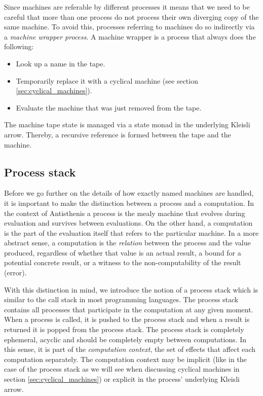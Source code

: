 Since machines are referable by different processes it means that we
need to be careful that more than one process do not process their own
diverging copy of the same machine. To avoid this, processes referring
to machines do so indirectly via a \emph{machine wrapper process}. A
machine wrapper is a process that always does the following:

\begin{itemize}
\item Look up a name in the tape.
\item Temporarily replace it with a cyclical machine (see section
  \ref{sec:cyclical_machines}).
\item Evaluate the machine that was just removed from the tape.
\end{itemize}

The machine tape state is managed via a state monad in the underlying
Kleisli arrow. Thereby, a recursive reference is formed between the
tape and the machine.

\subsection{Process stack}
\label{sec:process_stack}

Before we go further on the details of how exactly named machines
are handled, it is important to make the distinction between a process
and a computation. In the context of Antisthenis a process is the
mealy machine that evolves during evaluation and survives between
evaluations. On the other hand, a computation is the part of the
evaluation itself that refers to the particular machine. In a more
abstract sense, a computation is the \emph{relation} between the
process and the value produced, regardless of whether that value is an
actual result, a bound for a potential concrete result, or a witness to the
non-computability of the result (error).

With this distinction in mind, we introduce the notion of a process
stack which is similar to the call stack in most programming
languages. The process stack contains all processes that participate
in the computation at any given moment. When a process is called, it
is pushed to the process stack and when a result is returned it is
popped from the process stack. The process stack is completely
ephemeral, acyclic and should be completely empty between
computations. In this sense, it is part of the \emph{computation
  context}, the set of effects that affect each computation
separately. The computation context may be implicit (like in the case
of the process stack as we will see when discussing cyclical machines
in section \ref{sec:cyclical_machines}) or explicit in the process'
underlying Kleisli arrow.

